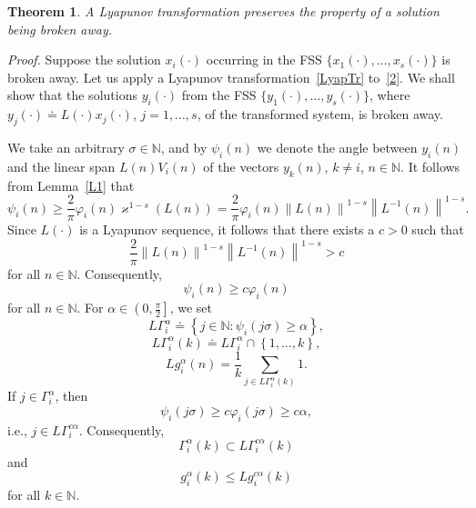 \documentclass[11pt]{article}
\newtheorem{theorem}{Theorem}[section]
\begin{document}
\begin{theorem}
\it
A Lyapunov transformation preserves the property of 
a solution being broken away.
\end{theorem}

\emph{Proof.}
Suppose the solution $x_{i}(\cdot )$ occurring in the FSS $\bigl\{x_{1}(\cdot
),\dots ,x_{s}(\cdot )\bigr\}$ is broken away. Let us apply a Lyapunov
transformation~\eqref{LyapTr} to~\eqref{2}. We shall show that the solutions 
$y_{i}(\cdot )$ from the FSS $\bigl\{y_{1}(\cdot ),\dots ,y_{s}(\cdot )%
\bigr\}
$, where $y_{j}(\cdot )\doteq L(\cdot )x_{j}(\cdot )$, $j=1,\dots ,s$, of
the transformed system, is broken away.

We take an arbitrary $\sigma \in \mathbb{N}$, and by $\psi _{i}(n)$ we
denote the angle between $y_{i}( n) $ and the linear span $%
L(n)V_{i}(n)$ of the vectors $y_{k}(n)$, $k\neq i$, $n\in\mathbb{N}$. It
follows from Lemma~\ref{L1} that%
\begin{equation*}
\psi _{i}(n)\ge \frac{2}{\pi }\varphi _{i}( n) \varkappa
^{1-s}( L(n)) 
=\frac{2}{\pi }\varphi _{i}( n)
\left\| L( n) \right\| ^{1-s}\left\| L^{-1}(
n) \right\| ^{1-s}.
\end{equation*}%
Since $L(\cdot)$ is a Lyapunov sequence, it follows that there exists a $c>0$
such that%
\begin{equation*}
\frac{2}{\pi }\left\| L( n) \right\| ^{1-s}\left\|
L^{-1}( n) \right\| ^{1-s}>c
\end{equation*}%
for all $n\in \mathbb{N}$. Consequently,%
\begin{equation*}
\psi _{i}(n)\ge c\varphi _{i}( n)
\end{equation*}%
for all $n\in \mathbb{N}$. For $\alpha \in \left( 0,\frac{\pi }{2}\right] $,
we set 
\begin{equation*}
L\Gamma _{i}^{\alpha }\doteq\left\{ j\in \mathbb{N}\colon\psi _{i}(j\sigma
)\ge \alpha \right\} ,
\end{equation*}%
\begin{equation*}
L\Gamma _{i}^{\alpha }( k)\doteq L\Gamma _{i}^{\alpha }\cap
\left\{ 1,\dots,k\right\} ,
\end{equation*}%
\begin{equation*}
Lg_{i}^{\alpha }(n)=\frac{1}{k}\sum_{j\in L\Gamma _{i}^{\alpha }(
k) }1.
\end{equation*}%
If $j\in \Gamma _{i}^{\alpha }$, then 
\begin{equation*}
\psi _{i}(j\sigma )\ge c\varphi _{i}(j\sigma )\ge c\alpha ,
\end{equation*}%
i.e., $j\in L\Gamma _{i}^{c\alpha }$. Consequently,%
\begin{equation*}
\Gamma _{i}^{\alpha }( k) \subset L\Gamma _{i}^{c\alpha}(k)
\end{equation*}%
and 
\begin{equation*}
g_{i}^{\alpha }(k)\le Lg_{i}^{c\alpha }(k)
\end{equation*}%
for all $k\in \mathbb{N}$.
\end{document}

